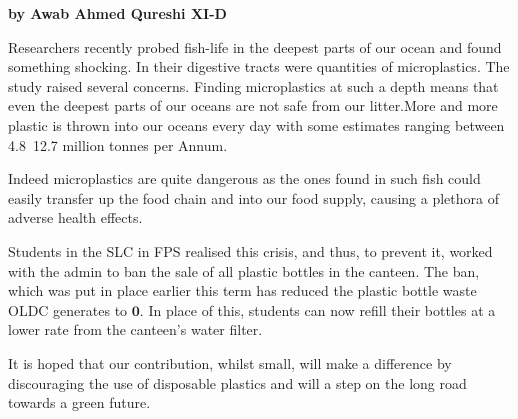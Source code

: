 \documentclass{article}
\date{\today}
\begin{document}
\maketitle
\large 



\textbf{by Awab Ahmed Qureshi XI-D}

Researchers recently probed fish-life in the deepest parts of our ocean and found something shocking. In their digestive tracts were quantities of microplastics. The study raised several concerns. Finding microplastics at such a depth means that even the deepest parts of our oceans are not safe from our litter.More and more plastic is thrown into our oceans every day with some estimates ranging between 4.8~12.7 million tonnes per Annum.

Indeed microplastics are quite dangerous as the ones found in such fish could easily transfer up the food chain and into our food supply, causing a plethora of adverse health effects.

Students in the SLC in FPS realised this crisis, and thus, to prevent it, worked with the admin to ban the sale of all plastic bottles in the canteen. The ban, which was put in place earlier this term has reduced the plastic bottle waste OLDC generates to $\boldsymbol{0}$. In place of this, students can now refill their bottles at a lower rate from the canteen's water filter.

It is hoped that our contribution, whilst small, will make a difference by discouraging the use of disposable plastics and will a step on the long road towards a green future. 


\closearticle
\end{document}
